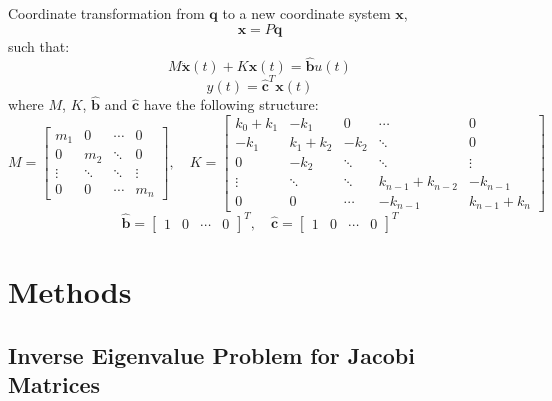 \documentclass{beamer}
\begin{document}
\begin{frame}
Coordinate transformation from $\mathbf{q}$ to a new coordinate system $\mathbf{x}$,
\begin{equation}
\mathbf{x} = P \mathbf{q}
\label{eq:transform}
\end{equation}
such that:
\begin{equation}
M\ddot{\mathbf{x}}(t) + K\mathbf{x}(t) = \mathbf{\hat{b}}u(t)
\label{eq:ms1}
\end{equation}
\begin{equation}
y(t) = \mathbf{\hat{c}}^T \mathbf{x}(t)
\label{eq:ms2}
\end{equation}
where $M$, $K$, $\mathbf{\hat{b}}$ and $\mathbf{\hat{c}}$ have the following structure:
\footnotesize{
$$
M = \begin{bmatrix}
m_1  &  0 & \cdots & 0 \\
0 & m_2  & \ddots & 0 \\
\vdots & \ddots & \ddots & \vdots \\
0 & 0 & \cdots & m_n \end{bmatrix}
, \quad
K = \begin{bmatrix}
k_0+k_1  &  -k_1 & 0 & \cdots & 0 \\
-k_1 & k_1+k_2  & -k_2 & \ddots & 0 \\
0 & -k_2 & \ddots & \ddots & \vdots \\
\vdots & \ddots & \ddots & k_{n-1}+k_{n-2} & -k_{n-1} \\
0 & 0 & \cdots & -k_{n-1} &  k_{n-1} + k_n \end{bmatrix}
$$
$$
\mathbf{\hat{b}} = \begin{bmatrix} 1 & 0 & \cdots & 0 \end{bmatrix}^T
,\quad \mathbf{\hat{c}} = \begin{bmatrix} 1 & 0 & \cdots & 0 \end{bmatrix}^T
\label{eq:ms3}
$$
}
\end{frame}

\section{Methods}
\subsection{Inverse Eigenvalue Problem for Jacobi Matrices}
\begin{frame}
\end{frame}
\end{document}
